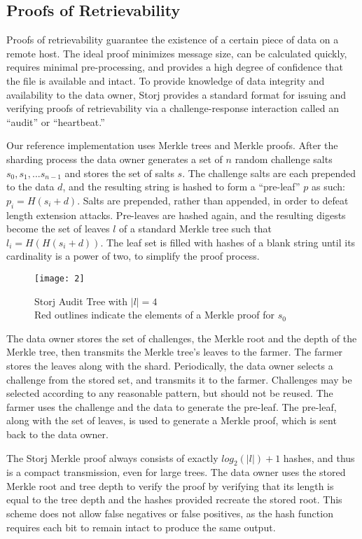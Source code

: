 \documentclass[a4paper,10pt]{article}
\begin{document}
\subsection{Proofs of Retrievability}
Proofs of retrievability guarantee the existence of a certain piece of data on a remote host. The ideal proof minimizes message size, can be calculated quickly, requires minimal pre-processing, and provides a high degree of confidence that the file is available and intact. To provide knowledge of data integrity and availability to the data owner, Storj provides a standard format for issuing and verifying proofs of retrievability via a challenge-response interaction called an “audit” or “heartbeat.”

Our reference implementation uses Merkle trees \cite{5} and Merkle proofs. After the sharding process the data owner generates a set of $ n $ random challenge salts $ s_{0}, s_{1}, ... s_{n-1} $ and stores the set of salts $ s $. The challenge salts are each prepended to the data $ d $, and the resulting string is hashed to form a “pre-leaf” $ p $ as such: $ p_{i} = H(s_{i} + d) $. Salts are prepended, rather than appended, in order to defeat length extension attacks. Pre-leaves are hashed again, and the resulting digests become the set of leaves $ l $ of a standard Merkle tree such that $ l_{i} = H(H(s_{i} + d)) $. The leaf set is filled with hashes of a blank string until its cardinality is a power of two, to simplify the proof process.

\begin{figure}[hbt]
\centering
\texttt{[image: 2]}
\caption{Storj Audit Tree with $ |l| = 4 $\\Red outlines indicate the elements of a Merkle proof for $ s_{0} $}
\end{figure}

The data owner stores the set of challenges, the Merkle root and the depth of the Merkle tree, then transmits the Merkle tree’s leaves to the farmer. The farmer stores the leaves along with the shard. Periodically, the data owner selects a challenge from the stored set, and transmits it to the farmer. Challenges may be selected according to any reasonable pattern, but should not be reused. The farmer uses the challenge and the data to generate the pre-leaf. The pre-leaf, along with the set of leaves, is used to generate a Merkle proof, which is sent back to the data owner.

The Storj Merkle proof always consists of exactly $ log_{2}(|l|)+1 $ hashes, and thus is a compact transmission, even for large trees. The data owner uses the stored Merkle root and tree depth to verify the proof by verifying that its length is equal to the tree depth and the hashes provided recreate the stored root. This scheme does not allow false negatives or false positives, as the hash function requires each bit to remain intact to produce the same output.
\end{document}
